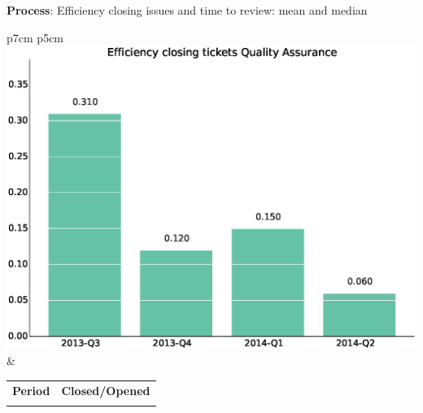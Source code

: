 \documentclass[a4wide,11pt]{report}
\begin{document}
\textbf{Process}: Efficiency closing issues and time to review: mean and median

\begin{tabular}{p{7cm} p{5cm}}
    \vspace{0pt} 
    \includegraphics[scale=.35]{figs/bmiQualityAssurance.eps}
    & 
    \vspace{0pt}
    \begin{tabular}{l|l}%
    \bfseries Period & \bfseries Closed/Opened %
    \csvreader[head to column names]{data/bmiQualityAssurance.csv}{}%
    {\\ & \bmi}
    \end{tabular}
\end{tabular}
\end{document}
